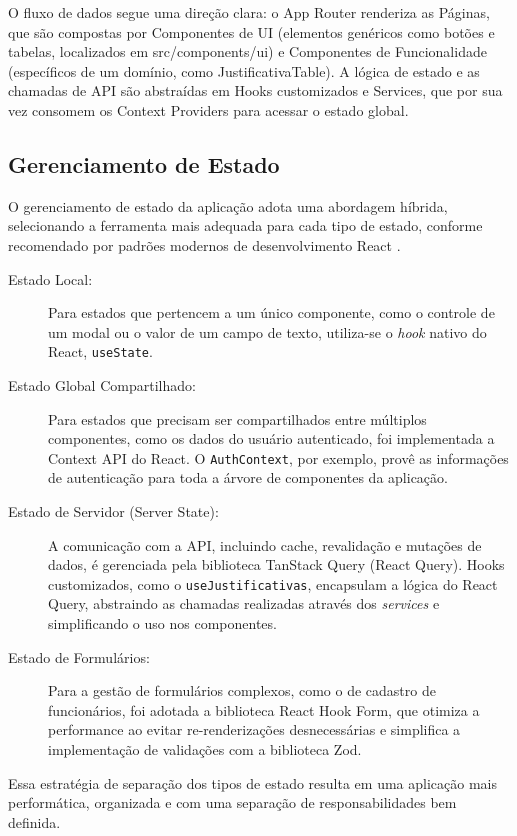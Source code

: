 O fluxo de dados segue uma direção clara: o App Router renderiza as Páginas, que são compostas por Componentes de UI (elementos genéricos como botões e tabelas, localizados em src/components/ui) e Componentes de Funcionalidade (específicos de um domínio, como JustificativaTable). A lógica de estado e as chamadas de API são abstraídas em Hooks customizados e Services, que por sua vez consomem os Context Providers para acessar o estado global.

\subsection{Gerenciamento de Estado}

O gerenciamento de estado da aplicação adota uma abordagem híbrida, selecionando a ferramenta mais adequada para cada tipo de estado, conforme recomendado por padrões modernos de desenvolvimento React \cite{ReactDocsState}.

\begin{description}
    \item[Estado Local:] Para estados que pertencem a um único componente, como o controle de um modal ou o valor de um campo de texto, utiliza-se o \textit{hook} nativo do React, \texttt{useState}.
    \item[Estado Global Compartilhado:] Para estados que precisam ser compartilhados entre múltiplos componentes, como os dados do usuário autenticado, foi implementada a Context API do React. O \texttt{AuthContext}, por exemplo, provê as informações de autenticação para toda a árvore de componentes da aplicação.
    \item[Estado de Servidor (Server State):] A comunicação com a API, incluindo cache, revalidação e mutações de dados, é gerenciada pela biblioteca TanStack Query (React Query). Hooks customizados, como o \texttt{useJustificativas}, encapsulam a lógica do React Query, abstraindo as chamadas realizadas através dos \textit{services} e simplificando o uso nos componentes.
    \item[Estado de Formulários:] Para a gestão de formulários complexos, como o de cadastro de funcionários, foi adotada a biblioteca React Hook Form, que otimiza a performance ao evitar re-renderizações desnecessárias e simplifica a implementação de validações com a biblioteca Zod.
\end{description}

Essa estratégia de separação dos tipos de estado resulta em uma aplicação mais performática, organizada e com uma separação de responsabilidades bem definida.

